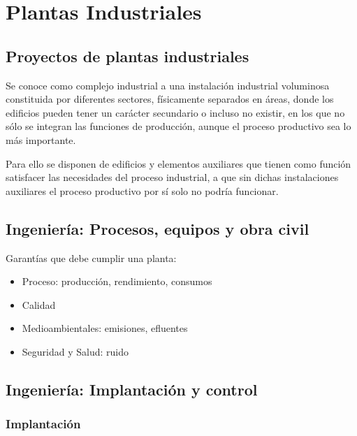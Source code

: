 \chapter{Plantas Industriales}

\section{Proyectos de plantas industriales}

Se conoce como complejo industrial a una instalación industrial voluminosa constituida por diferentes sectores, físicamente separados en áreas, donde los edificios pueden tener un carácter secundario o incluso no existir, en los que no sólo se integran las funciones de producción, aunque el proceso productivo sea lo más importante.

Para ello se disponen de edificios y elementos auxiliares que tienen como función satisfacer las necesidades del proceso industrial, a que sin dichas instalaciones auxiliares el proceso productivo por sí solo no podría funcionar.

\section{Ingeniería: Procesos, equipos y obra civil}

Garantías que debe cumplir una planta:
\begin{itemize}
    \item Proceso: producción, rendimiento, consumos
    \item Calidad
    \item Medioambientales: emisiones, efluentes
    \item Seguridad y Salud: ruido
\end{itemize}

\section{Ingeniería: Implantación y control}

\subsection*{Implantación}

